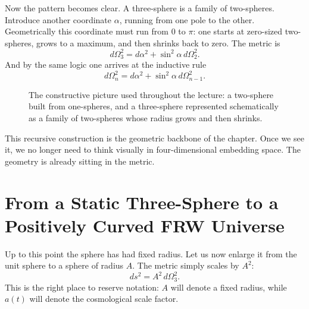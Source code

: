 Now the pattern becomes clear. A three-sphere is a family of two-spheres. Introduce another coordinate \(\alpha\), running from one pole to the other. Geometrically this coordinate must run from \(0\) to \(\pi\): one starts at zero-sized two-spheres, grows to a maximum, and then shrinks back to zero. The metric is
\begin{equation}
d\Omega_3^2=d\alpha^2+\sin^2\alpha\,d\Omega_2^2.
\end{equation}
And by the same logic one arrives at the inductive rule
\begin{equation}
d\Omega_n^2=d\alpha^2+\sin^2\alpha\,d\Omega_{n-1}^2.
\end{equation}

\begin{figure}[htbp]
\centering
{}
\caption{The constructive picture used throughout the lecture: a two-sphere built from one-spheres, and a three-sphere represented schematically as a family of two-spheres whose radius grows and then shrinks.}
\end{figure}

This recursive construction is the geometric backbone of the chapter. Once we see it, we no longer need to think visually in four-dimensional embedding space. The geometry is already sitting in the metric.

\section{From a Static Three-Sphere to a Positively Curved FRW Universe}

Up to this point the sphere has had fixed radius. Let us now enlarge it from the unit sphere to a sphere of radius \(A\). The metric simply scales by \(A^2\):
\begin{equation}
ds^2=A^2\,d\Omega_3^2.
\end{equation}
This is the right place to reserve notation: \(A\) will denote a fixed radius, while \(a(t)\) will denote the cosmological scale factor.

